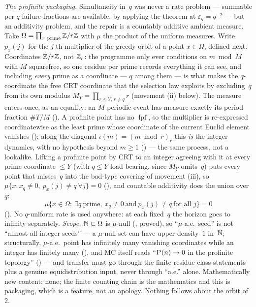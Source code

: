 \documentclass[10pt,a4paper]{article}
\newcommand{\lpf}{\operatorname{lpf}}
\begin{document}
\noindent\emph{The profinite packaging.}  Simultaneity in~$q$ was never a
rate problem --- summable per-$q$ failure fractions are available, by
applying the theorem at $\varepsilon_q=q^{-2}$ --- but an additivity
problem, and the repair is a countably additive ambient measure.  Take
$\Omega=\prod_{r\ \text{prime}}\ZZ/r\ZZ$ with $\mu$ the product of the
uniform measures.  Write $p_x(j)$ for the $j$-th multiplier of the greedy
orbit of a point $x\in\Omega$, defined next.  Coordinates $\mathbb{Z}/r\mathbb{Z}$, not $\mathbb{Z}_r$: the programme only
ever conditions on $m\bmod M$ with $M$ squarefree, so one residue per
prime records everything it can see, and including \emph{every} prime as a
coordinate --- $q$ among them --- is what makes the $q$-coordinate the free
CRT coordinate that the selection law exploits by excluding~$q$ from its
own modulus $M_Y=\prod_{r\le Y,\,r\ne q}r$ (movement (ii) below).
The measure enters once, as an equality: an $M$-periodic event has measure
exactly its period fraction $\#T/M$
().
A profinite point has no $\lpf$, so the multiplier is re-expressed
coordinatewise as the least prime whose coordinate of the current Euclid
element vanishes
(); along the
diagonal $\iota(m)=(m\bmod r)_r$ this \emph{is} the integer dynamics, with
no hypothesis beyond $m\ge1$
() --- the same
process, not a lookalike.  Lifting a profinite point by CRT to an integer
agreeing with it at every prime coordinate $\le Y$ (with $q\le Y$
load-bearing, since $M_Y$ omits~$q$) puts every point that misses~$q$ into
the bad-type covering of movement (iii), so
$\mu\{x: x_q\ne0,\ p_x(j)\ne q\ \forall j\}=0$
(),
and countable additivity does the union over~$q$:
\[
  \mu\bigl\{x\in\Omega:\ \exists q\ \text{prime},\ x_q\ne0
     \ \text{and}\ p_x(j)\ne q\ \text{for all } j\bigr\}=0
\]
().
No $q$-uniform rate is used anywhere: at each fixed~$q$ the horizon goes to
infinity separately.  \emph{Scope.}  $\mathbb{N}\subset\Omega$ is $\mu$-null
(,
proved), so ``$\mu$-a.e.\ seed'' is not ``almost all integer seeds'' --- a
$\mu$-null set can have upper density~$1$ in~$\mathbb{N}$; structurally, $\mu$-a.e.\ point
has infinitely many vanishing coordinates while an integer has finitely many
(),
and MC itself reads ``$\mathrm{P}_{}(n)\to0$ in the profinite topology''
() --- and transfer must go
through the finite residue-class statements plus a genuine
equidistribution input, never through ``a.e.'' alone.  Mathematically new
content: none; the finite counting chain is the mathematics and this is
packaging, which is a feature, not an apology.  Nothing follows about the
orbit of~$2$.
\end{document}
